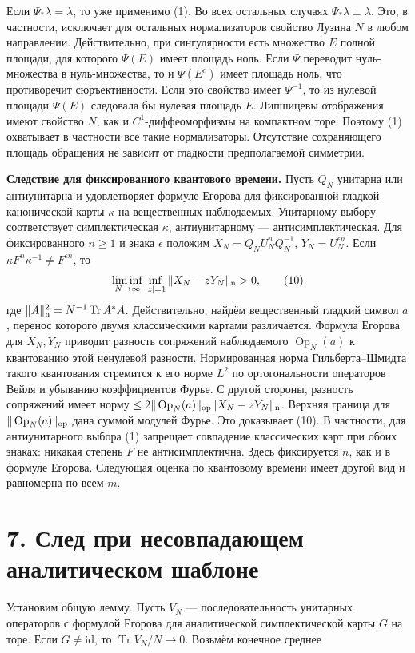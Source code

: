 \documentclass[11pt,a4paper]{article}
\newcommand{\Tr}{\operatorname{Tr}}
\newcommand{\sect}[1]{\section*{\sffamily\color{ink}#1}}
\newcommand{\subt}[1]{\par\medskip\noindent\textbf{#1.}\quad}
\begin{document}
Если $\Psi_*\lambda=\lambda$, то уже применимо (1). Во всех остальных случаях $\Psi_*\lambda\perp\lambda$. Это, в частности, исключает для остальных нормализаторов свойство Лузина $N$ в любом направлении. Действительно, при сингулярности есть множество $E$ полной площади, для которого $\Psi(E)$ имеет площадь ноль. Если $\Psi$ переводит нуль-множества в нуль-множества, то и $\Psi(E^c)$ имеет площадь ноль, что противоречит сюръективности. Если это свойство имеет $\Psi^{-1}$, то из нулевой площади $\Psi(E)$ следовала бы нулевая площадь $E$. Липшицевы отображения имеют свойство $N$, как и $C^1$-диффеоморфизмы на компактном торе. Поэтому (1) охватывает в частности все такие нормализаторы. Отсутствие сохраняющего площадь обращения не зависит от гладкости предполагаемой симметрии.

\subt{Следствие для фиксированного квантового времени} Пусть $Q_N$ унитарна или антиунитарна и удовлетворяет формуле Егорова для фиксированной гладкой канонической карты $\kappa$ на вещественных наблюдаемых. Унитарному выбору соответствует симплектическая $\kappa$, антиунитарному --- антисимплектическая. Для фиксированного $n\ge1$ и знака $\epsilon$ положим $X_N=Q_N U_N^nQ_N^{-1}$, $Y_N=U_N^{\epsilon n}$. Если $\kappa F^n\kappa^{-1}\ne F^{\epsilon n}$, то
\[
        \liminf_{N\to\infty}\inf_{|z|=1}
                              \|X_N-zY_N\|_{\rm n}>0,              \tag{10}
\]
где $\|A\|_{\rm n}^2=N^{-1}\Tr A^*A$. Действительно, найдём вещественный гладкий символ $a$, перенос которого двумя классическими картами различается. Формула Егорова для $X_N,Y_N$ приводит разность сопряжений наблюдаемого $\operatorname{Op}_N(a)$ к квантованию этой ненулевой разности. Нормированная норма Гильберта--Шмидта такого квантования стремится к его норме $L^2$ по ортогональности операторов Вейля и убыванию коэффициентов Фурье. С другой стороны, разность сопряжений имеет норму $\le 2\|\operatorname{Op}_N(a)\|_{\rm op}\|X_N-zY_N\|_{\rm n}$. Верхняя граница для $\|\operatorname{Op}_N(a)\|_{\rm op}$ дана суммой модулей Фурье. Это доказывает (10). В частности, для антиунитарного выбора (1) запрещает совпадение классических карт при обоих знаках: никакая степень $F$ не антисимплектична. Здесь фиксируется $n$, как и в формуле Егорова. Следующая оценка по квантовому времени имеет другой вид и равномерна по всем $m$.
\newpage
\sect{7. След при несовпадающем аналитическом шаблоне}
Установим общую лемму. Пусть $V_N$ --- последовательность унитарных операторов с формулой Егорова для аналитической симплектической карты $G$ на торе. Если $G\ne\mathrm{id}$, то $\Tr V_N/N\to0$. Возьмём конечное среднее
\end{document}
